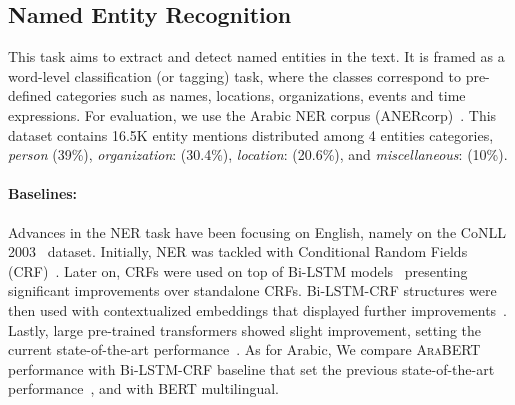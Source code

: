 \documentclass[10pt, a4paper]{article}
\begin{document}
\subsection{Named Entity Recognition}
This task aims to extract and detect named entities in the text.  It is framed as a word-level classification (or tagging) task, where the classes correspond to pre-defined categories such as names, locations, organizations, events and time expressions.  For evaluation, we use the Arabic NER corpus (ANERcorp)~\cite{benajiba2007anersys}.
This dataset contains 16.5K entity mentions distributed among 4 entities categories, \emph{person} (39\%), \emph{organization}: (30.4\%), \emph{location}: (20.6\%), and \emph{miscellaneous}: (10\%).

\paragraph{Baselines:} Advances in the NER task have been focusing on English, namely on the CoNLL 2003~\cite{sang2003introduction} dataset. Initially, NER was tackled with Conditional Random Fields (CRF)~\cite{lafferty2001conditional}. Later on, CRFs were used on top of Bi-LSTM models~\cite{huang2015bidirectional,lample2016neural} presenting significant improvements over standalone CRFs. Bi-LSTM-CRF structures were then used with contextualized  embeddings that displayed further improvements~\cite{peters2018deep}.
Lastly, large pre-trained transformers showed slight improvement, setting the current state-of-the-art performance~\cite{devlin2018bert}.  As for Arabic, We compare \textsc{AraBERT} performance with Bi-LSTM-CRF baseline that set the previous state-of-the-art performance~\cite{el2019arabic}, and with BERT multilingual.
\end{document}
